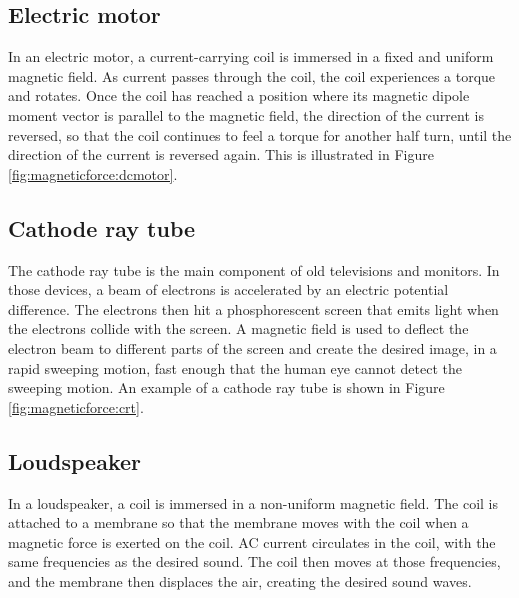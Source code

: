 \subsection{Electric motor}
In an electric motor, a current-carrying coil is immersed in a fixed and uniform magnetic field. As current passes through the coil, the coil experiences a torque and rotates. Once the coil has reached a position where its magnetic dipole moment vector is parallel to the magnetic field, the direction of the current is reversed, so that the coil continues to feel a torque for another half turn, until the direction of the current is reversed again. This is illustrated in Figure \ref{fig:magneticforce:dcmotor}.


\subsection{Cathode ray tube}
The cathode ray tube is the main component of old televisions and monitors. In those devices, a beam of electrons is accelerated by an electric potential difference. The electrons then hit a phosphorescent screen that emits light when the electrons collide with the screen. A magnetic field is used to deflect the electron beam to different parts of the screen and create the desired image, in a rapid sweeping motion, fast enough that the human eye cannot detect the sweeping motion. An example of a cathode ray tube is shown in Figure \ref{fig:magneticforce:crt}.


\subsection{Loudspeaker}
In a loudspeaker, a coil is immersed in a non-uniform magnetic field. The coil is attached to a membrane so that the membrane moves with the coil when a magnetic force is exerted on the coil. AC current circulates in the coil, with the same frequencies as the desired sound. The coil then moves at those frequencies, and the membrane then displaces the air, creating the desired sound waves.

